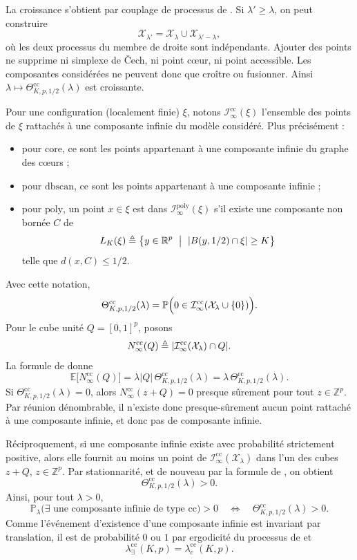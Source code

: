 \begin{Preuve}
La croissance s'obtient par couplage de processus de .
Si $\lambda'\geq\lambda$, on peut construire
\[
\mathcal X_{\lambda'}=\mathcal X_{\lambda}\cup
\mathcal X_{\lambda'-\lambda},
\]
où les deux processus du membre de droite sont indépendants. Ajouter des points ne supprime ni simplexe de \v{C}ech, ni point cœur, ni point accessible.
Les composantes considérées ne peuvent donc que croître ou fusionner. Ainsi
$\lambda\mapsto\Theta^{\mathrm{cc}}_{K,p,1/2}(\lambda)$ est croissante.

Pour une configuration (localement finie) $\xi$, notons $\mathcal I_{\infty}^{\mathrm{cc}}(\xi)$ l'ensemble des points de $\xi$ rattachés à une composante infinie du modèle considéré. Plus précisément :
\begin{itemize}
    \item pour $\mathrm{core}$, ce sont les points appartenant à une composante infinie du graphe des cœurs ;
    \item pour $\mathrm{dbscan}$, ce sont les points appartenant à une composante \DBSCAN infinie ;
    \item pour $\mathrm{poly}$, un point $x\in\xi$ est dans $\mathcal I_{\infty}^{\mathrm{poly}}(\xi)$ s'il existe une composante non bornée $C$ de
    \[
    L_K(\xi) \eqdef \bigl\{y\in\mathbb R^p \ \bigm| \ |B(y,1/2)\cap \xi|\geq K\bigr\}
    \]
    telle que $d(x,C)\leq 1/2$.
\end{itemize}
Avec cette notation,
\[
\Theta^{\mathrm{cc}}_{K,p,1/2}(\lambda)
=
\mathbb P\Bigl(
0\in
\mathcal I_{\infty}^{\mathrm{cc}}
(\mathcal X_{\lambda}\cup\{0\})
\Bigr).
\]
Pour le cube unité $Q=[0,1]^p$, posons
\[
N_{\infty}^{\mathrm{cc}}(Q)
\triangleq
\lvert 
\mathcal I_{\infty}^{\mathrm{cc}}(\mathcal X_{\lambda})
\cap Q
 \rvert.
\]
La formule de  donne
\[
\mathbb E\bigl[N_{\infty}^{\mathrm{cc}}(Q)\bigr]
=
\lambda |Q|\,
\Theta^{\mathrm{cc}}_{K,p,1/2}(\lambda)
=
\lambda\,
\Theta^{\mathrm{cc}}_{K,p,1/2}(\lambda).
\]
Si
$\Theta^{\mathrm{cc}}_{K,p,1/2}(\lambda)=0$, alors
$N_{\infty}^{\mathrm{cc}}(z+Q)=0$ presque sûrement pour tout
$z\in\mathbb Z^p$. Par réunion dénombrable, il n'existe donc presque-sûrement aucun point rattaché à une composante infinie, et donc pas de composante infinie.

Réciproquement, si une composante infinie existe avec probabilité strictement positive, alors elle fournit au moins un point de $\mathcal I_{\infty}^{\mathrm{cc}}(\mathcal X_{\lambda})$ dans l'un des cubes $z+Q$, $z\in\mathbb Z^p$. Par stationnarité, et de nouveau par la formule de , on obtient
\[
\Theta^{\mathrm{cc}}_{K,p,1/2}(\lambda)>0.
\]
Ainsi, pour tout $\lambda>0$,
\[
\mathbb P_{\lambda}\bigl(
\exists\text{ une composante infinie de type }\mathrm{cc}
\bigr)>0
\quad\Longleftrightarrow\quad
\Theta^{\mathrm{cc}}_{K,p,1/2}(\lambda)>0.
\]
Comme l'événement d'existence d'une composante infinie est invariant par
translation, il est de probabilité $0$ ou $1$ par ergodicité du processus de  et
\[
\lambda^{\mathrm{cc}}_{\exists}(K,p)
=
\lambda^{\mathrm{cc}}_{c}(K,p).
\]


\end{Preuve}
